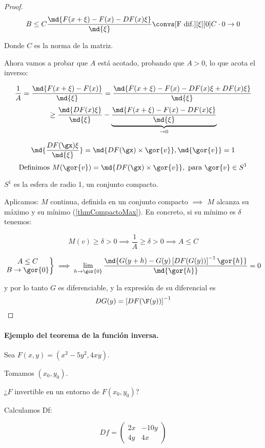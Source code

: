 \begin{proof}
  $$B\leq C \frac{\md{F(x+\xi) - F(x) - DF(x)\xi}}{\md{\xi}} \convs[\text{F dif.}][\xi][0] C\cdot 0 \rightarrow 0$$

  Donde $C$ es la norma de la matriz.


  Ahora vamos a probar que $A$ está acotado, probando que $A>0$, lo que acota el inverso:

  $$\frac{1}{A} = \frac{\md{F(x+\xi)-F(x)}}{\md{\xi}} = \frac{\md{F(x+\xi) - F(x) - DF(x)\xi + DF(x)\xi}}{\md{\xi}}$$
  $$\geq \frac{\md{DF(x)\xi}}{\md{\xi}} - \underbrace{\frac{\md{F(x+\xi) - F(x) - DF(x)\xi}}{\md{\xi}}}_{\rightarrow 0}$$


  $$\md{\frac{DF(\gx)\xi}{\md{\xi}}} = \md{DF(\gx)\times\gor{v}}, \md{\gor{v}} = 1$$
  $$\text{Definimos } M(\gor{v}) = \md{DF(\gx)\times\gor{v}}, \text{ para } \gor{v} \in S^1$$

  $S^1$ es la esfera de radio 1, un conjunto compacto.


  Aplicamos: $M$ continua, definida en un conjunto compacto $\implies$ $M$ alcanza su máximo y su mínimo (\ref{thmCompactoMax}). En concreto, si su mínimo es $\delta$ tenemos:

  $$ M(v)\geq \delta > 0 \implies \frac{1}{A}\geq \delta > 0 \implies A\leq C $$


  $$\left.\begin{matrix}A \leq C\\B \rightarrow \gor{0}\end{matrix}\right\} \implies \lim_{h \rightarrow \gor{0}}\frac{\md{G(y+h) - G(y) \left[DF(G(y))\right]^{-1} \gor{h}}}{\md{\gor{h}}} = 0$$

  y por lo tanto $G$ es diferenciable, y la expresión de su diferencial es \[ DG(y) = \left[DF(\F(y))\right]^{-1} \]
\end{proof}

\paragraph{Ejemplo del teorema de la función inversa.}
Sea $F(x,y) = (x^2-5y^2,4xy)$.

Tomamos $(x_0,y_0)$.

¿$F$ invertible en un entorno de $F(x_0,y_0)$?

Calculamos Df:

$$Df = \begin{pmatrix}
        2x&-10y\\
        4y & 4x
       \end{pmatrix}
$$

